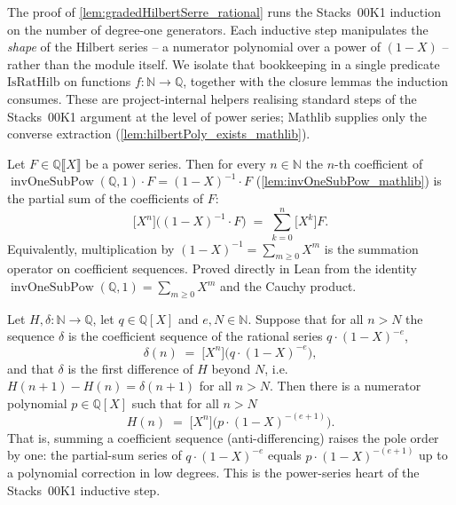 The proof of \cref{lem:gradedHilbertSerre_rational} runs the Stacks~00K1 induction
on the number of degree-one generators. Each inductive step manipulates the
\emph{shape} of the Hilbert series -- a numerator polynomial over a power of
\((1-X)\) -- rather than the module itself. We isolate that bookkeeping in a
single predicate \(\mathrm{IsRatHilb}\) on functions \(f : \mathbb{N} \to
\mathbb{Q}\), together with the closure lemmas the induction consumes. These are
project-internal helpers realising standard steps of the Stacks~00K1 argument at
the level of power series; Mathlib supplies only the converse extraction
(\cref{lem:hilbertPoly_exists_mathlib}).

\begin{lemma}\leanok
  \label{lem:coeff_invOneSubPow_one_mul}
  Let \(F \in \mathbb{Q}\llbracket X\rrbracket\) be a power series. Then for every
  \(n \in \mathbb{N}\) the \(n\)-th coefficient of
  \(\operatorname{invOneSubPow}(\mathbb{Q}, 1)\cdot F = (1-X)^{-1}\cdot F\)
  (\cref{lem:invOneSubPow_mathlib}) is the partial sum of the coefficients of
  \(F\):
  \[
    \bigl[X^n\bigr]\bigl((1-X)^{-1}\cdot F\bigr)
    \;=\; \sum_{k=0}^{n} \bigl[X^k\bigr] F .
  \]
  Equivalently, multiplication by \((1-X)^{-1} = \sum_{m\ge 0} X^m\) is the
  summation operator on coefficient sequences. Proved directly in Lean from the
  identity \(\operatorname{invOneSubPow}(\mathbb{Q},1) = \sum_{m\ge 0} X^m\) and
  the Cauchy product.
\end{lemma}

\begin{lemma}\leanok
  \label{lem:rationalHilbert_antidiff}
  Let \(H, \delta : \mathbb{N} \to \mathbb{Q}\), let \(q \in \mathbb{Q}[X]\) and
  \(e, N \in \mathbb{N}\). Suppose that for all \(n > N\) the sequence \(\delta\)
  is the coefficient sequence of the rational series \(q\cdot(1-X)^{-e}\),
  \[
    \delta(n) \;=\; \bigl[X^n\bigr]\bigl(q\cdot(1-X)^{-e}\bigr),
  \]
  and that \(\delta\) is the first difference of \(H\) beyond \(N\), i.e.
  \(H(n+1) - H(n) = \delta(n+1)\) for all \(n > N\). Then there is a numerator
  polynomial \(p \in \mathbb{Q}[X]\) such that for all \(n > N\)
  \[
    H(n) \;=\; \bigl[X^n\bigr]\bigl(p\cdot(1-X)^{-(e+1)}\bigr).
  \]
  That is, summing a coefficient sequence (anti-differencing) raises the pole
  order by one: the partial-sum series of \(q\cdot(1-X)^{-e}\) equals
  \(p\cdot(1-X)^{-(e+1)}\) up to a polynomial correction in low degrees. This is
  the power-series heart of the Stacks~00K1 inductive step.
\end{lemma}

